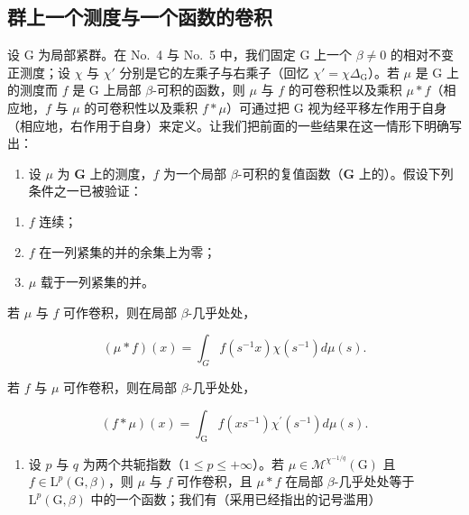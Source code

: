 \subsection{群上一个测度与一个函数的卷积}

设 G 为局部紧群。在 No.~4 与 No.~5 中，我们固定 G 上一个 \(\beta \neq 0\) 的相对不变正测度；设 \(\chi\) 与 \(\chi'\) 分别是它的左乘子与右乘子（回忆 \(\chi' = \chi \Delta_{\mathrm{G}}\)）。若 \(\mu\) 是 G 上的测度而 \(f\) 是 G 上局部 \(\beta\)-可积的函数，则 \(\mu\) 与 \(f\) 的可卷积性以及乘积 \(\mu * f\)（相应地，\(f\) 与 \(\mu\) 的可卷积性以及乘积 \(f * \mu\)）可通过把 G 视为经平移左作用于自身（相应地，右作用于自身）来定义。让我们把前面的一些结果在这一情形下明确写出：

\begin{enumerate}
\def\labelenumi{\arabic{enumi})}
\tightlist
\item
  设 \(\mu\) 为 \(\mathbf{G}\) 上的测度，\(f\) 为一个局部 \(\beta\)-可积的复值函数（\(\mathbf{G}\) 上的）。假设下列条件之一已被验证：
\end{enumerate}

\begin{enumerate}
\def\labelenumi{(\roman{enumi})}
\item
  \(f\) 连续；
\item
  \(f\) 在一列紧集的并的余集上为零；
\item
  \(\mu\) 载于一列紧集的并。
\end{enumerate}

若 \(\mu\) 与 \(f\) 可作卷积，则在局部 \(\beta\)-几乎处处，

\[
(\mu * f) (x) = \int_ {G} f (s ^ {- 1} x) \chi (s ^ {- 1}) d \mu (s).\tag{10}
\]

若 \(f\) 与 \(\mu\) 可作卷积，则在局部 \(\beta\)-几乎处处，

\[
(f * \mu) (x) = \int_ {\mathrm{G}} f (x s ^ {- 1}) \chi^ {\prime} (s ^ {- 1}) d \mu (s).\tag{11}
\]

\begin{enumerate}
\def\labelenumi{\arabic{enumi})}
\setcounter{enumi}{1}
\tightlist
\item
  设 \(p\) 与 \(q\) 为两个共轭指数（\(1 \leqslant p \leqslant +\infty\)）。若 \(\mu \in \mathcal{M}^{\chi^{-1/q}}(\mathrm{G})\) 且 \(f \in \mathrm{L}^p(\mathrm{G},\beta)\)，则 \(\mu\) 与 \(f\) 可作卷积，且 \(\mu * f\) 在局部 \(\beta\)-几乎处处等于 \(\mathrm{L}^p(\mathrm{G},\beta)\) 中的一个函数；我们有（采用已经指出的记号滥用）
\end{enumerate}

